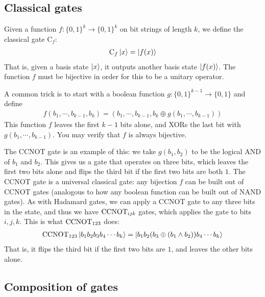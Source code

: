 \subsection{Classical gates}

\newcommand{\Cl}{\mathrm{C}}

Given a function $f : \{0,1\}^k \to \{0,1\}^k$ on bit strings of length $k$, we define the classical gate $\Cl_f$:
\begin{align}
  \Cl_f \ket{x} = \ket{f(x)}         \label{eqn:classicalgate}
\end{align}
That is, given a basis state $\ket{x}$, it outputs another basis state $\ket{f(x)}$.
The function $f$ must be bijective in order for this to be a unitary operator.

A common trick is to start with a boolean function $g : \{0,1\}^{k-1} \to \{0,1\}$ and define
\begin{align}
  f(b_1,\cdots,b_{k-1},b_k) = (b_1,\cdots,b_{k-1}, b_k \oplus g(b_1,\cdots,b_{k-1}))     \label{eqn:xortrick}
\end{align}
This function $f$ leaves the first $k-1$ bits alone, and XORs the last bit with $g(b_1,\cdots,b_{k-1})$.
You may verify that $f$ is always bijective.

The CCNOT gate is an example of this: we take $g(b_1,b_2)$ to be the logical AND of $b_1$ and $b_2$.
This gives us a gate that operates on three bits, which leaves the first two bits alone and flips the third bit if the first two bits are both $1$.
The CCNOT gate is a universal classical gate: any bijection $f$ can be built out of CCNOT gates (analogous to how any boolean function can be built out of NAND gates).
As with Hadamard gates, we can apply a CCNOT gate to any three bits in the state, and thus we have $\mathrm{CCNOT}_{ijk}$ gates,
which applies the gate to bits $i,j,k$. This is what $\mathrm{CCNOT}_{123}$ does:
\begin{align*}
  \mathrm{CCNOT}_{123} \ket{b_1 b_2 b_3 b_4 \cdots b_k} = \ket{b_1 b_2 (b_3 \oplus (b_1 \wedge b_2)) b_4 \cdots b_k}
\end{align*}
That is, it flips the third bit if the first two bits are $1$, and leaves the other bits alone.

\subsection{Composition of gates}

